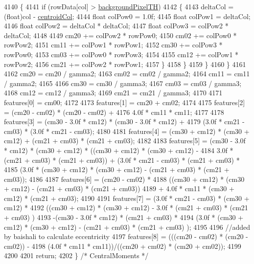 \begin{DoxyCode}
4140       \{
4141         \textcolor{keywordflow}{if}  (rowData[col] > \hyperlink{class_k_k_b_1_1_raster_a3c4e96eaf48274f5d8912617f81f2a0b}{backgroundPixelTH})
4142         \{
4143           deltaCol = (float)col - \hyperlink{class_k_k_b_1_1_raster_ac4cb3984d20f6eef6fd4f201681ea1d5}{centroidCol};
4144           \textcolor{keywordtype}{float}  colPow0 = 1.0f;
4145           \textcolor{keywordtype}{float}  colPow1 = deltaCol;
4146           \textcolor{keywordtype}{float}  colPow2 = deltaCol * deltaCol;
4147           \textcolor{keywordtype}{float}  colPow3 = colPow2  * deltaCol;
4148 
4149           cm20 += colPow2 * rowPow0;
4150           cm02 += colPow0 * rowPow2;
4151           cm11 += colPow1 * rowPow1;
4152           cm30 += colPow3 * rowPow0;
4153           cm03 += colPow0 * rowPow3;
4154 
4155           cm12 += colPow1 * rowPow2;
4156           cm21 += colPow2 * rowPow1;
4157         \}
4158       \}
4159     \}
4160   \}
4161 
4162   cm20 = cm20 / gamma2;
4163   cm02 = cm02 / gamma2;
4164   cm11 = cm11 / gamma2;
4165 
4166   cm30 = cm30 / gamma3;
4167   cm03 = cm03 / gamma3;
4168   cm12 = cm12 / gamma3;
4169   cm21 = cm21 / gamma3;
4170 
4171   features[0] = cm00;
4172 
4173   features[1] = cm20 + cm02;
4174  
4175   features[2] = (cm20 - cm02) * (cm20 - cm02) + 
4176                 4.0f * cm11 * cm11;
4177 
4178   features[3] = (cm30 - 3.0f * cm12) * (cm30 - 3.0f * cm12) + 
4179                 (3.0f * cm21 - cm03) * (3.0f * cm21 - cm03);
4180 
4181   features[4] = (cm30 + cm12) * (cm30 + cm12) + (cm21 + cm03) * (cm21 + cm03);
4182 
4183   features[5] = (cm30 - 3.0f * cm12) * (cm30 + cm12) * ((cm30 + cm12) * (cm30 + cm12) - 
4184                 3.0f * (cm21 + cm03) * (cm21 + cm03))  +  (3.0f * cm21 - cm03) * (cm21 + cm03) * 
4185                 (3.0f * (cm30 + cm12) * (cm30 + cm12) - (cm21 + cm03) * (cm21 + cm03));
4186 
4187   features[6] = (cm20 - cm02) * 
4188                 ((cm30 + cm12) * (cm30 + cm12) - (cm21 + cm03) * (cm21 + cm03))
4189                 + 4.0f * cm11 * (cm30 + cm12) * (cm21 + cm03);
4190 
4191   features[7] = (3.0f * cm21 - cm03) * (cm30 + cm12) * 
4192                 ((cm30 + cm12) * (cm30 + cm12) - 3.0f * (cm21 + cm03) * (cm21 + cm03) )
4193                -(cm30 - 3.0f * cm12) * (cm21 + cm03) * 
4194                (3.0f * (cm30 + cm12) * (cm30 + cm12) - (cm21 + cm03) * (cm21 + cm03) );
4195 
4196   \textcolor{comment}{//added by baishali to calculate eccentricity}
4197   features[8] = (((cm20 - cm02) * (cm20 - cm02)) - 
4198                 (4.0f * cm11 * cm11))/((cm20 + cm02) * (cm20 + cm02));
4199 
4200 
4201   \textcolor{keywordflow}{return};
4202 \}  \textcolor{comment}{/* CentralMoments */}
\end{DoxyCode}

